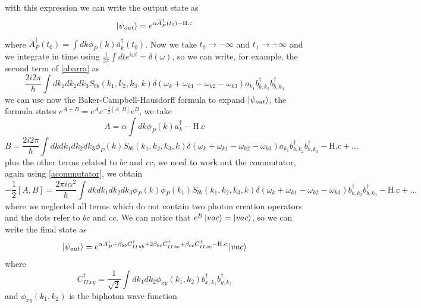 with this expression we can write the output state as
\begin{equation}\ket{\psi_{out}} = e^{\alpha \overline{A}_P^\dagger(t_0)-\text{H.c}}\end{equation}
where $\overline{A}_P^\dagger(t_0) = \int dk \phi_P(k)\overline{a}_k^\dagger(t_0)$. Now we take $t_0\to -\infty$ and $t_1 \to +\infty$ and we integrate in time using $\frac{1}{2\pi} \int dt e^{i\omega t} = \delta(\omega)$, so we can write, for example, the second term of \eqref{abarra} as
\begin{equation}\frac{2i2\pi }{\hbar}\int dk_1dk_2 dk_3S_{bb}(k_1,k_2,k_3,k)\delta(\omega_{k}+\omega_{k1}-\omega_{k2}-\omega_{k3})a_{k_1}b_{b,k_2}^\dagger b_{b,k_3}^\dagger \end{equation}
we can use now the Baker-Campbell-Hausdorff formula to expand $\ket{\psi_{out}}$, the formula states $e^{A+B} = e^{A}e^{-\frac{1}{2}[A,B]} e^{B}$, we take 
\begin{equation}A =\alpha \int dk \phi_P(k)a_k^\dagger - \text{H.c} \end{equation}
\begin{equation}B = \frac{2i2\pi }{\hbar}\int dk dk_1dk_2 dk_3\phi_P(k)S_{bb}(k_1,k_2,k_3,k)\delta(\omega_{k}+\omega_{k1}-\omega_{k2}-\omega_{k3})a_{k_1}b_{b,k_2}^\dagger b_{b,k_3}^\dagger -\text{H.c} +\dots\end{equation}
plus the other terms related to $bc$ and $cc$, we need to work out the commutator, again using \eqref{acommutator}, we obtain
\begin{equation}-\frac{1}{2}[A,B] = \frac{2\pi i \alpha^2}{\hbar}\int dk dk_1dk_2 dk_3\phi_P(k)\phi_P(k_1)S_{bb}(k_1,k_2,k_3,k)\delta(\omega_{k}+\omega_{k1}-\omega_{k2}-\omega_{k3})b_{b,k_2}^\dagger b_{b,k_3}^\dagger -\text{H.c} +\dots\end{equation}
where we neglected all terms which do not contain two photon creation operators and the dots refer to $bc$ and $cc$. We can notice that $e^B\ket{vac} = \ket{vac}$, so we can write the final state as
\begin{equation}\ket{\psi_{out}} = e^{\alpha A_P^\dagger + \beta_{bb} C^\dagger_{II\,bb}+ 2\beta_{bc} C^\dagger_{II\,bc}+ \beta_{cc} C^\dagger_{II\,cc}-\text{H.c}}\ket{vac}\end{equation}
where
\begin{equation}C^\dagger_{II\, xy} = \frac{1}{\sqrt{2}}\int dk_1 dk_2 \phi_{xy}(k_1,k_2)b_{x,k_1}^\dagger b_{y,k_2}^\dagger \end{equation}
and $\phi_{xy}(k_1,k_2)$ is the biphoton wave function 
